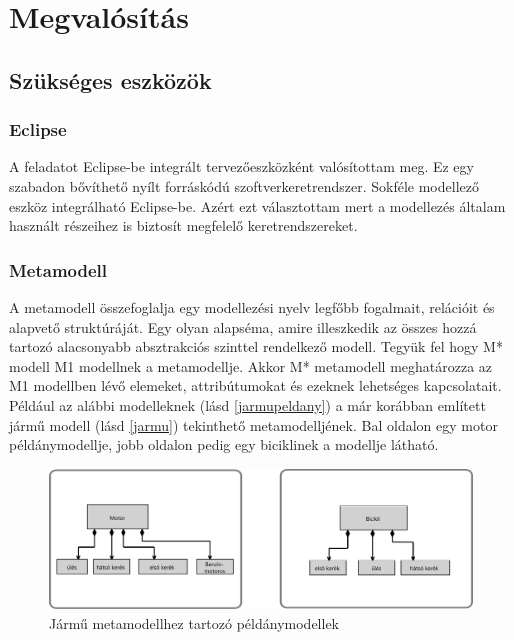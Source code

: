\chapter{Megvalósítás}\label{chapter:realization}
\section{Szükséges eszközök}
\subsection{Eclipse}
A feladatot Eclipse-be integrált tervezőeszközként valósítottam meg. Ez egy szabadon bővíthető nyílt forráskódú szoftverkeretrendszer. Sokféle modellező eszköz integrálható  Eclipse-be. Azért ezt választottam mert a modellezés általam használt részeihez is biztosít megfelelő keretrendszereket.
\subsection{Metamodell}
A metamodell összefoglalja egy modellezési nyelv legfőbb fogalmait, relációit és alapvető struktúráját. Egy olyan alapséma, amire illeszkedik az összes hozzá tartozó alacsonyabb absztrakciós szinttel rendelkező modell. 
Tegyük fel hogy M* modell M1 modellnek a metamodellje.
Akkor M* metamodell meghatározza az M1 modellben lévő elemeket, attribútumokat és ezeknek lehetséges kapcsolatait. Például az alábbi modelleknek (lásd \autoref{jarmupeldany}) a már korábban említett jármű modell (lásd \autoref{jarmu}) tekinthető metamodelljének. Bal oldalon egy motor példánymodellje, jobb oldalon pedig egy biciklinek a modellje látható.

\begin{figure}[!ht]
	\centering
	\includegraphics[width=130mm]{figures/peldany.pdf}
	\caption{Jármű metamodellhez tartozó példánymodellek} 
	\label{jarmupeldany}
\end{figure}

